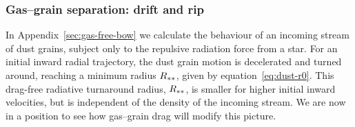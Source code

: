 


\subsubsection{Gas--grain separation: drift and rip}
\label{sec:gas-grain-separ}

In Appendix~\ref{sec:gas-free-bow} we calculate the behaviour of an
incoming stream of dust grains, subject only to the repulsive
radiation force from a star.  For an initial inward radial trajectory,
the dust grain motion is decelerated and turned around, reaching a
minimum radius \(R_{**}\), given by equation~\eqref{eq:dust-r0}.
This drag-free radiative turnaround radius, \(R_{**}\), is smaller
for higher initial inward velocities, but is independent of the
density of the incoming stream.  We are now in a position to see how
gas--grain drag will modify this picture.

